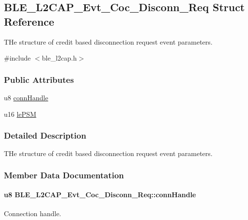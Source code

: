 \hypertarget{struct_b_l_e___l2_c_a_p___evt___coc___disconn___req}{}\subsection{B\+L\+E\+\_\+\+L2\+C\+A\+P\+\_\+\+Evt\+\_\+\+Coc\+\_\+\+Disconn\+\_\+\+Req Struct Reference}
\label{struct_b_l_e___l2_c_a_p___evt___coc___disconn___req}


T\+He structure of credit based disconnection request event parameters.  




{\ttfamily \#include $<$ble\+\_\+l2cap.\+h$>$}

\subsubsection*{Public Attributes}
\begin{DoxyCompactItemize}
\item 
u8 \hyperlink{struct_b_l_e___l2_c_a_p___evt___coc___disconn___req_a7c3b7ad9d02019ab7a311e7c746e24f0}{conn\+Handle}
\item 
u16 \hyperlink{struct_b_l_e___l2_c_a_p___evt___coc___disconn___req_a82b47ab8ebe5a475d04676bfdb9014aa}{le\+P\+SM}
\end{DoxyCompactItemize}


\subsubsection{Detailed Description}
T\+He structure of credit based disconnection request event parameters. 

\subsubsection{Member Data Documentation}
\paragraph[{\texorpdfstring{conn\+Handle}{connHandle}}]{\setlength{\rightskip}{0pt plus 5cm}u8 B\+L\+E\+\_\+\+L2\+C\+A\+P\+\_\+\+Evt\+\_\+\+Coc\+\_\+\+Disconn\+\_\+\+Req\+::conn\+Handle}\hypertarget{struct_b_l_e___l2_c_a_p___evt___coc___disconn___req_a7c3b7ad9d02019ab7a311e7c746e24f0}{}\label{struct_b_l_e___l2_c_a_p___evt___coc___disconn___req_a7c3b7ad9d02019ab7a311e7c746e24f0}
Connection handle. 
